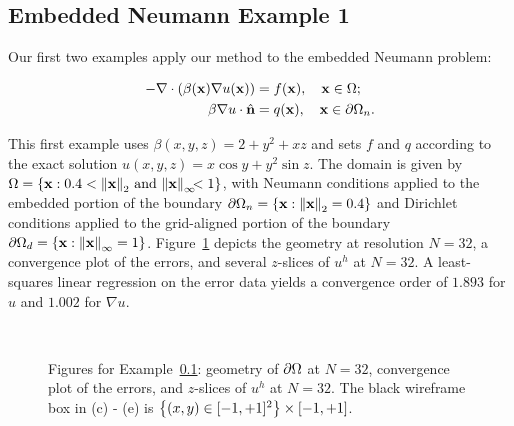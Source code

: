 \subsection{Embedded Neumann Example 1} \label{subsec:ch4.examples.neumann.1}

Our first two examples apply our method to the embedded Neumann problem:

\begin{align*}
-\nabla \cdot \left( \beta(\mathbf{x}) \nabla u(\mathbf{x}) \right) & = f(\mathbf{x}), \quad \mathbf{x} \in \Omega; \\
\beta \nabla u \cdot \hat{\mathbf{n}} & = q(\mathbf{x}), \quad \mathbf{x} \in \partial\Omega_n.
\end{align*}

This first example uses $\beta(x,y,z) = 2 + y^2 + xz$ and sets $f$ and $q$ according to the exact solution $u(x,y,z) = x \cos y + y^2 \sin z$. The domain is given by $\Omega = \left\lbrace  \mathbf{x} : 0.4 < \left\lVert \mathbf{x} \right\rVert_2 \, \text{and} \, \left\lVert \mathbf{x} \right\rVert_{\infty} \!\!\! < 1  \right\rbrace$, with Neumann conditions applied to the embedded portion of the boundary $\dOmega_n = \linebreak[4] \set{ \bfx : \norm{\bfx}_2 = 0.4 }$ and Dirichlet conditions applied to the grid-aligned portion of the boundary $\partial\Omega_d = \left\lbrace  \mathbf{x} : \left\lVert \mathbf{x} \right\rVert_{\infty} = 1  \right\rbrace$. Figure~\ref{fig:ch4.examples.neumann.1} depicts the geometry at resolution $N = 32$, a convergence plot of the errors, and several $z$-slices of $u^h$ at $N = 32$. A least-squares linear regression on the error data yields a convergence order of $1.893$ for $u$ and $1.002$ for $\nabla u$.

\setlength{\figureheighti}{0.30\textwidth}
\setlength{\figurewidthii}{0.33\textwidth}
\begin{figure}[htbp]
\centering
{}
 \\
\caption{Figures for Example~\ref{subsec:ch4.examples.neumann.1}: geometry of $\partial\Omega$ at $N = 32$, convergence plot of the errors, and $z$-slices of $u^h$ at $N = 32$. The black wireframe box in (c) - (e) is $\left\lbrace  (x,y) \in [-1,+1]^2  \right\rbrace \times [-1,+1]$.}
\label{fig:ch4.examples.neumann.1}
\end{figure}

